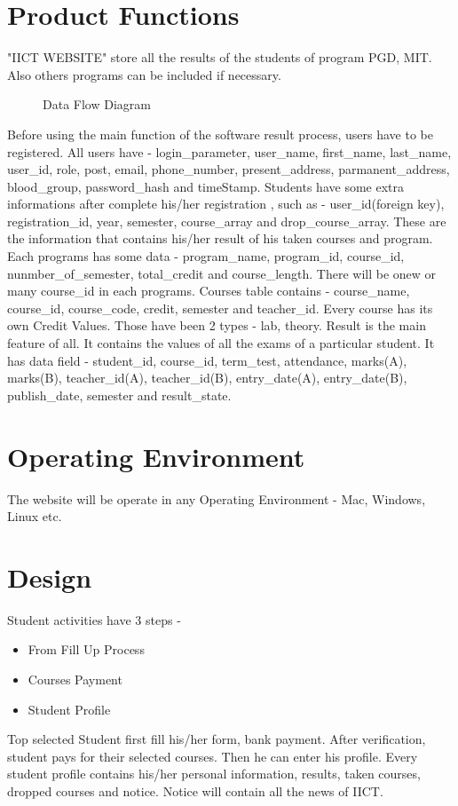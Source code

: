 \documentclass{scrreprt}
\begin{document}
\section{Product Functions}
"IICT WEBSITE" store all the results of the students of program PGD, MIT. Also others programs can be included if necessary.
\begin{figure}[h!]
    \centering
    \caption{Data Flow Diagram}
    \label{fig:Data Flow Diagram}
\end{figure}
Before using the main function of the software result process, users have to be registered. 
\newline
All users have - login\_parameter, user\_name, first\_name, last\_name, user\_id, role, post, email, phone\_number, present\_address, parmanent\_address, blood\_group, password\_hash and timeStamp.
\newline
Students have some extra informations after complete his/her registration , such as - user\_id(foreign key), registration\_id, year, semester, course\_array and drop\_course\_array. These are the information that contains his/her result of his taken courses and program.
\newline
Each programs has some data - program\_name, program\_id, course\_id, nunmber\_of\_semester, total\_credit and course\_length. There will be onew or many course\_id in each programs.
\newline
Courses table contains - course\_name, course\_id, course\_code, credit, semester and teacher\_id.
\newline
Every course has its own Credit Values. Those have been 2 types - lab, theory.
\newline
Result is the main feature of all. It contains the values of all the exams of a particular student. It has data field - student\_id, course\_id, term\_test, attendance, marks(A), marks(B), teacher\_id(A), teacher\_id(B), entry\_date(A), entry\_date(B), publish\_date, semester	and result\_state.

\section{Operating Environment}
The website will be operate in any Operating Environment - Mac, Windows, Linux etc. 

\section{Design}
Student activities have 3 steps -
\begin{itemize}
    \item From Fill Up Process
    \item Courses Payment
    \item Student Profile
\end{itemize}
Top selected Student first fill his/her form, bank payment. After verification, student pays for their selected courses. Then he can enter his profile. 
\newline
Every student profile contains his/her personal information, results, taken courses, dropped courses and notice.
\newline
Notice will contain all the news of IICT.
\end{document}
